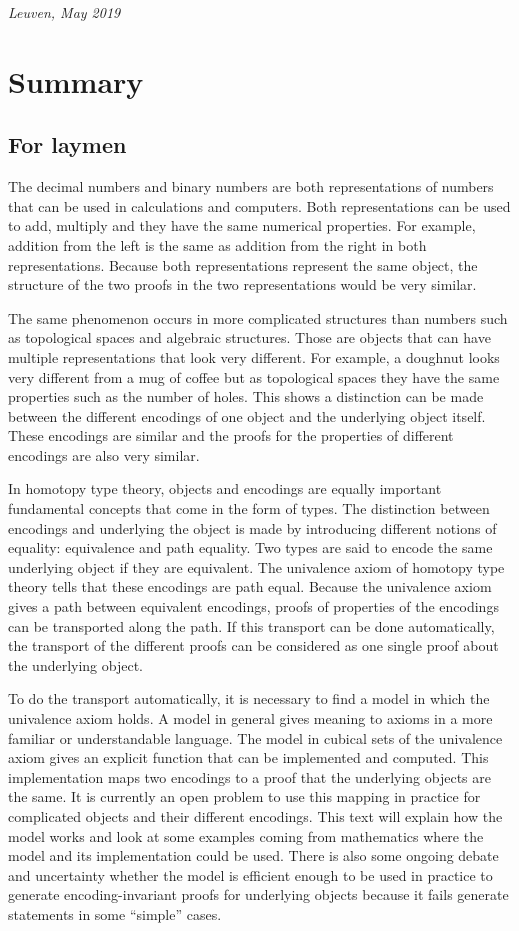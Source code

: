 \documentclass[12pt,a4paper,twoside,xetex]{book} %
\begin{document}
\mbox{}\hfill \textit{Leuven, May 2019}

\chapter*{Summary}

\section*{For laymen}

The decimal numbers and binary numbers are both representations of numbers that can be used in calculations and computers. Both representations can be used to add, multiply and they have the same numerical properties. For example, addition from the left is the same as addition from the right in both representations. Because both representations  represent the same object, the structure of the two proofs in the two representations would be very similar.  

The same phenomenon occurs in more complicated structures than numbers such as topological spaces and algebraic structures. Those are objects that can have multiple representations that look very different. For example, a doughnut looks very different from a mug of coffee but as topological spaces they have the same properties such as the number of holes. This shows a distinction can be made between the different encodings of one object and the underlying object itself. These encodings are similar and the proofs for the properties of different encodings are also very similar.

In homotopy type theory, objects and encodings are equally important fundamental concepts that come in the form of types. The distinction between encodings and underlying the object is made by introducing  different notions of equality: equivalence and path equality. Two types are said to encode the same underlying object if they are equivalent. The univalence axiom of homotopy type theory tells that these encodings are path equal. Because the univalence axiom gives a path between equivalent encodings, proofs of properties of the encodings can be transported along the path. If this transport can be done automatically, the transport of the different proofs can be considered as one single proof about the underlying object. 

To do the transport automatically, it is necessary to find a model in which the univalence axiom holds. A model in general gives meaning to axioms in a more familiar or understandable language. The model in cubical sets of the univalence axiom gives an explicit function that can be implemented and computed. This implementation maps two encodings to a proof that the underlying objects are the same. It is currently an open problem to use this mapping in practice for complicated objects and their different encodings. This text will explain how the model works and look at some examples coming from mathematics where the model and its implementation could be used. There is also some ongoing debate and uncertainty whether the model is efficient enough to be used in practice to generate encoding-invariant proofs for underlying objects because it fails generate statements in some ``simple'' cases.
\end{document}
